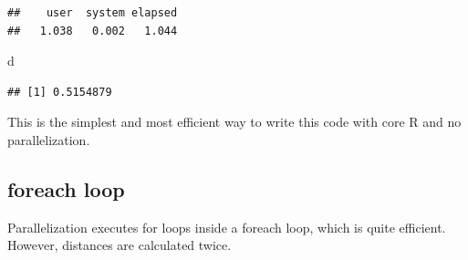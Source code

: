 \documentclass[
  12pt,
  american,
  a4paper,
  extrafontsizes,onecolumn,openright
  ]{memoir}
\newenvironment{Shaded}{\begin{snugshade}}{\end{snugshade}}
\newcommand{\AttributeTok}[1]{\textcolor[rgb]{0.13,0.29,0.53}{#1}}
\newcommand{\ControlFlowTok}[1]{\textcolor[rgb]{0.13,0.29,0.53}{\textbf{#1}}}
\newcommand{\DecValTok}[1]{\textcolor[rgb]{0.00,0.00,0.81}{#1}}
\newcommand{\FunctionTok}[1]{\textcolor[rgb]{0.13,0.29,0.53}{\textbf{#1}}}
\newcommand{\NormalTok}[1]{#1}
\newcommand{\OtherTok}[1]{\textcolor[rgb]{0.56,0.35,0.01}{#1}}
\newcommand{\SpecialCharTok}[1]{\textcolor[rgb]{0.81,0.36,0.00}{\textbf{#1}}}
\newcommand{\StringTok}[1]{\textcolor[rgb]{0.31,0.60,0.02}{#1}}
\begin{document}
\begin{verbatim}
##    user  system elapsed 
##   1.038   0.002   1.044
\end{verbatim}

\begin{Shaded}
\begin{Highlighting}[]
\NormalTok{d}
\end{Highlighting}
\end{Shaded}

\begin{verbatim}
## [1] 0.5154879
\end{verbatim}

\normalsize

This is the simplest and most efficient way to write this code with core R and no parallelization.

\subsection{foreach loop}\label{foreach-loop}

Parallelization executes for loops inside a foreach loop, which is quite efficient.
However, distances are calculated twice.

\scriptsize

\begin{Shaded}
\end{Shaded}
\end{document}
